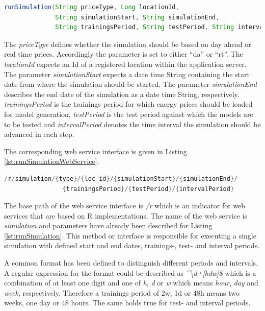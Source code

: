\begin{minipage}{\linewidth}
\begin{lstlisting}[language=Java, caption=Method runSimulation, label={lst:runSimulation}]
runSimulation(String priceType, Long locationId, 
              String simulationStart, String simulationEnd,
              String trainingsPeriod, String testPeriod, String intervalPeriod)
\end{lstlisting}
\end{minipage}

The \textit{priceType} defines whether the simulation should be based on day ahead or real time prices. Accordingly the parameter is set to either ``da'' or ``rt''. The \textit{locationId} expects an Id of a registered location within the application server. The parameter \textit{simulationStart} expects a date time String containing the start date from where the simulation should be started. The parameter \textit{simulationEnd} describes the end date of the simulation as a date time String, respectively. \textit{trainingsPeriod} is the trainings period for which energy prices should be loaded for model generation, \textit{testPeriod} is the test period against which the models are to be tested and \textit{intervalPeriod} denotes the time interval the simulation should be advanced in each step. 

The corresponding web service interface is given in Listing \ref{lst:runSimulationWebService}. 

\begin{minipage}{\linewidth}
\begin{lstlisting}[language=Java, caption=Method runSimulation web service interface, label={lst:runSimulationWebService}]
/r/simulation/{type}/{loc_id}/{simulationStart}/{simulationEnd}/
                {trainingsPeriod}/{testPeriod}/{intervalPeriod}
\end{lstlisting}
\end{minipage}

The base path of the web service interface is \textit{/r} which is an indicator for web services that are based on R implementations. The name of the web service is \textit{simulation} and parameters have already been described for Listing \ref{lst:runSimulation}. This method or interface is responsible for executing a single simulation with defined start and end dates, trainings-, test- and interval periods. 

A common format has been defined to distinguish different periods and intervals. A regular expression for the format could be described as \textit{\textasciicircum\textbackslash d+[hdw]\$}
which is a combination of at least one digit and one of \textit{h}, \textit{d} or \textit{w} which means \textit{hour}, \textit{day} and \textit{week}, respectively. 
Therefore a trainings period of 2w, 1d or 48h means two weeks, one day or 48 hours. The same holds true for test- and interval periods. 

